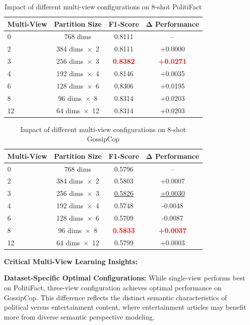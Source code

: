 \begin{table}[htbp]
\centering
\caption{Impact of different multi-view configurations on 8-shot PolitiFact}
\label{tab:hyperparameter_multi_view_politifact}
\begin{tabular}{lccc}
\toprule
\textbf{Multi-View} & \textbf{Partition Size} & \textbf{F1-Score} & \textbf{Δ Performance} \\
\midrule
0  & 768 dims & 0.8111 & -- \\
2  & 384 dims~$\times$~2 & 0.8111 & +0.0000 \\
3  & 256 dims~$\times$~3 & \textcolor{red}{\textbf{0.8382}} & \textcolor{red}{\textbf{+0.0271}} \\
4  & 192 dims~$\times$~4 & 0.8146 & +0.0035 \\
6  & 128 dims~$\times$~6 & 0.8306 & +0.0195 \\
8  & 96 dims~$\times$~8  & 0.8314 & +0.0203 \\ 
12 & 64 dims~$\times$~12 & 0.8314 & +0.0203 \\
\bottomrule
\end{tabular}
\end{table}

\begin{table}[htbp]
\centering
\caption{Impact of different multi-view configurations on 8-shot GossipCop}
\label{tab:hyperparameter_multi_view_gossipcop}
\begin{tabular}{lccc}
\toprule
\textbf{Multi-View} & \textbf{Partition Size} & \textbf{F1-Score} & \textbf{Δ Performance} \\
\midrule
0  & 768 dims & 0.5796 & -- \\
2  & 384 dims~$\times$~2 & 0.5803 & +0.0007 \\
3  & 256 dims~$\times$~3 & \underline{0.5826} & \underline{+0.0030} \\
4  & 192 dims~$\times$~4 & 0.5748 & -0.0048 \\
6  & 128 dims~$\times$~6 & 0.5709 & -0.0087 \\
8  & 96 dims~$\times$~8  & \textcolor{red}{\textbf{0.5833}} & \textcolor{red}{\textbf{+0.0037}} \\ 
12 & 64 dims~$\times$~12 & 0.5799 & +0.0003 \\
\bottomrule
\end{tabular}
\end{table}
    

\textbf{Critical Multi-View Learning Insights:}

\textbf{Dataset-Specific Optimal Configurations:} While single-view performs best on PolitiFact, three-view configuration achieves optimal performance on GossipCop. This difference reflects the distinct semantic characteristics of political versus entertainment content, where entertainment articles may benefit more from diverse semantic perspective modeling.

